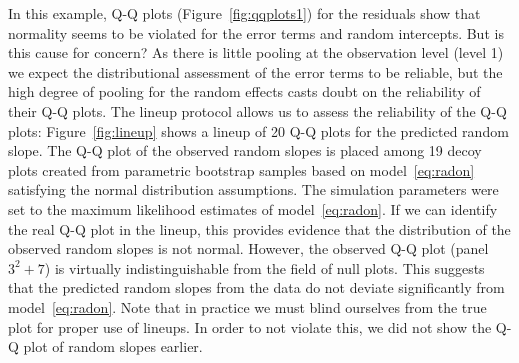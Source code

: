 \documentclass[12pt]{article} %
\begin{document}
In this example, Q-Q plots (Figure~\ref{fig:qqplots1}) for the residuals show that normality 
seems to be violated for the error terms and random intercepts. But is this cause for concern?
As there is little pooling at the observation level (level 1) we expect the distributional assessment of the error terms to be reliable, but  the high degree of pooling  for the random effects  casts doubt on the reliability of their Q-Q plots. The lineup protocol  \citep{buja:2009} allows us to assess the reliability of the Q-Q plots:
Figure~\ref{fig:lineup} shows a lineup of 20 Q-Q plots for the predicted random slope. The Q-Q plot of the observed random slopes is placed among 19 decoy plots created from parametric bootstrap samples based on model~\eqref{eq:radon} satisfying the normal distribution assumptions. The simulation parameters were set to the maximum likelihood estimates of model~\eqref{eq:radon}. 
If we can identify the real Q-Q plot in the lineup, this provides evidence that the distribution of the observed random slopes is not normal. However, 
the observed Q-Q plot (panel $3^2+7$) is virtually indistinguishable from the field of null plots. This suggests that the predicted random slopes  from the data do not deviate significantly from model~\eqref{eq:radon}.  
Note that in practice we must blind ourselves from the true plot for proper use of lineups. In order to not violate this, we did not show the Q-Q plot of random slopes earlier.
\end{document}
